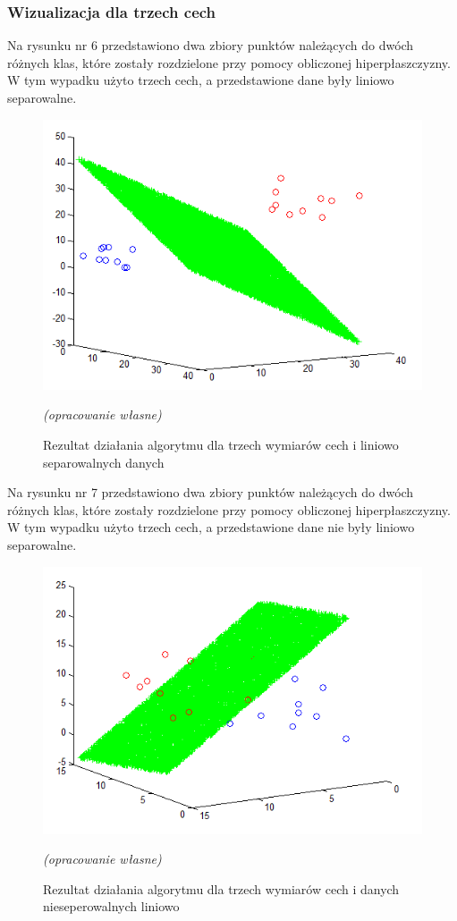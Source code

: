 \documentclass[[10pt,a4paper]{article}
\begin{document}
\subsubsection{Wizualizacja dla trzech cech}
Na rysunku nr 6 przedstawiono dwa zbiory punktów należących do dwóch różnych klas, które zostały rozdzielone przy pomocy obliczonej hiperpłaszczyzny. W tym wypadku użyto trzech cech, a przedstawione dane  były liniowo separowalne. 

\begin{figure}[h]
\centering
\includegraphics{visualize3}\\
\caption{Rezultat działania algorytmu dla trzech wymiarów cech i liniowo separowalnych danych }
\textit{(opracowanie własne)}
\end{figure}

Na rysunku nr 7 przedstawiono dwa zbiory punktów należących do dwóch różnych klas, które zostały rozdzielone przy pomocy obliczonej hiperpłaszczyzny. W tym wypadku użyto trzech cech, a przedstawione dane nie były liniowo separowalne. 

\begin{figure}[h]
\centering
\includegraphics{visualize4}\\
\caption{Rezultat działania algorytmu dla trzech wymiarów cech i danych nieseperowalnych liniowo }
\textit{(opracowanie własne)}
\end{figure}
\end{document}
